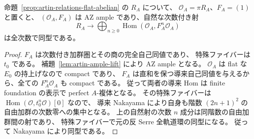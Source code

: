 \begin{proposition}
\label{prop:artin-presentation-full-orbit}
命題~\ref{prop:artin-relations-flat-abelian} の $R_A$ について、
$\mathcal O_A=\pi R_A$、$F_A=(1)$ と置くと、
$(\mathcal O_A,F_A)$ は AZ ample であり、自然な次数付き射
\[
 R_A\longrightarrow
 \bigoplus_{n\ge0}\operatorname{Hom}(\mathcal O_A,F_A^n\mathcal O_A)
\]
は全次数で同型である。
\end{proposition}
\begin{proof}
$F_A$ は次数付き加群圏とその商の完全自己同値であり、
特殊ファイバーは $t_0$ である。
補題~\ref{lem:artin-ample-lift} により AZ ample となる。
$\mathcal O_A$ は flat な $E_0$ の持上げなので compact であり、
$F_A$ は直和を保つ導来自己同値を与えるから、全ての $F_A^n\mathcal O_A$ も compact である。
従って両者の導来 Hom は finite foundation の表示で perfect $A$-複体となる。
その特殊ファイバーは $\operatorname{Hom}(\mathcal O,t_0^n\mathcal O)[0]$ なので、
導来 Nakayama により自身も階数 $(2n+1)^2$ の自由加群の次数零への集中となる。
上の自然射の次数 $n$ 成分は同階数の自由加群間の射であり、
特殊ファイバーで元の反 Serre 全軌道環の同型になる。
従って Nakayama により同型である。
\end{proof}

